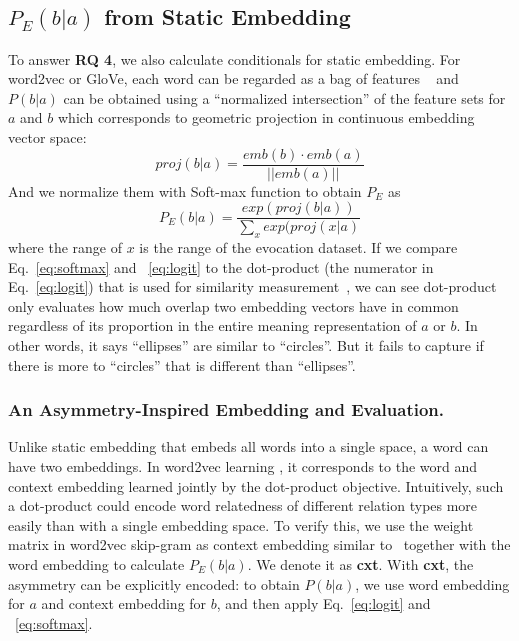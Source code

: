 \documentclass[letterpaper]{article} %
\begin{document}
\subsection{$P_E(b|a)$ from Static Embedding}
To answer \textbf{RQ 4}, we also calculate conditionals for static embedding. For word2vec or GloVe, each word can be regarded as a bag of features ~\citep{tversky1977features} and $P(b|a)$ can be obtained using a ``normalized intersection'' of the feature sets for $a$ and $b$ which corresponds to geometric projection in continuous embedding vector space:
\begin{equation}
\label{eq:logit}
    proj(b|a) = \frac{emb(b) \cdot emb(a)}{||emb(a)||}
\end{equation}
And we normalize them with Soft-max function to obtain $P_E$ as
\begin{equation}
\label{eq:softmax}
    P_E(b|a) = \frac{exp(proj(b|a))}{\sum_x exp(proj(x|a)}
\end{equation}
where the range of $x$ is the range of the evocation dataset.
If we compare Eq.~\ref{eq:softmax} and ~\ref{eq:logit} to the dot-product (the numerator in Eq.~\ref{eq:logit}) that is used for similarity measurement~\citep{Levy2014NeuralWE, nematzadeh2017evaluating, arora-etal-2016-latent}, we can see dot-product only evaluates how much overlap two embedding vectors have in common regardless of its proportion in the entire meaning representation of $a$ or $b$. In other words, it says ``ellipses'' are similar to ``circles''. But it fails to capture if there is more to ``circles'' that is different than ``ellipses''.

\subsubsection{An Asymmetry-Inspired Embedding and Evaluation.}
Unlike static embedding that embeds all words into a single space, a word can have two embeddings. In word2vec learning \cite{mikolov2013distributed}, it corresponds to the word and context embedding learned jointly by the dot-product objective. Intuitively, such a dot-product could encode word relatedness of different relation types more easily than with a single embedding space. To verify this, we use the weight matrix in word2vec skip-gram as context embedding similar to~\citep{torabi-asr-etal-2018-querying} together with the word embedding to calculate $P_E(b|a)$. We denote it as \textbf{cxt}. With \textbf{cxt}, the asymmetry can be explicitly encoded: to obtain $P(b|a)$, we use word embedding for $a$ and context embedding for $b$, and then apply Eq.~\ref{eq:logit} and ~\ref{eq:softmax}.
\end{document}
